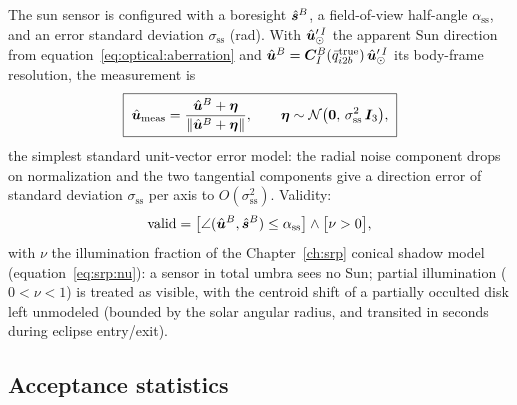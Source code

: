 The sun sensor is configured with a boresight $\hat{\bm{s}}^{B}$, a
field-of-view half-angle $\alpha_{\mathrm{ss}}$, and an error standard
deviation $\sigma_{\mathrm{ss}}$ (\unit{\radian}). With
$\hat{\bm{u}}'^{\,I}_{\odot}$ the apparent Sun direction from
equation~\eqref{eq:optical:aberration} and $\hat{\bm{u}}^{B} =
\bm{C}_{I}^{B}(\bar{q}_{i2b}^{\mathrm{true}})\, \hat{\bm{u}}'^{\,I}_{\odot}$
its body-frame resolution, the measurement is
\begin{equation}
  \boxed{\;
  \hat{\bm{u}}_{\mathrm{meas}}
    = \frac{\hat{\bm{u}}^{B} + \bm{\eta}}
           {\left\lVert \hat{\bm{u}}^{B} + \bm{\eta} \right\rVert},
  \qquad
  \bm{\eta} \sim \mathcal{N}\bigl(\bm{0},\,
    \sigma_{\mathrm{ss}}^2\,\bm{I}_3\bigr),
  \;}
  \label{eq:optical:sunsensor}
\end{equation}
the simplest standard unit-vector error model: the radial noise
component drops on normalization and the two tangential components give
a direction error of standard deviation $\sigma_{\mathrm{ss}}$ per axis
to $O(\sigma_{\mathrm{ss}}^2)$. Validity:
\begin{equation}
  \mathrm{valid} =
    \bigl[\angle(\hat{\bm{u}}^{B}, \hat{\bm{s}}^{B})
      \le \alpha_{\mathrm{ss}}\bigr]
    \wedge \bigl[\nu > 0\bigr],
  \label{eq:optical:sungate}
\end{equation}
with $\nu$ the illumination fraction of the Chapter~\ref{ch:srp} conical
shadow model (equation~\eqref{eq:srp:nu}): a sensor in total umbra sees
no Sun; partial illumination ($0 < \nu < 1$) is treated as visible, with
the centroid shift of a partially occulted disk left unmodeled (bounded
by the solar angular radius, and transited in seconds during eclipse
entry/exit).

\subsection{Acceptance statistics}
\label{sec:optical:stats}

